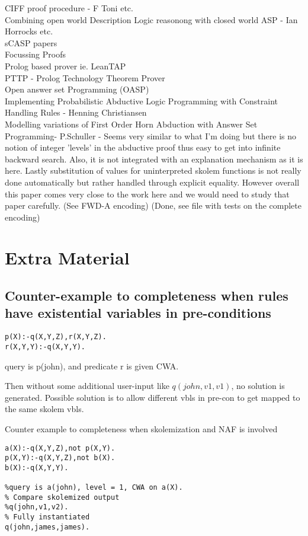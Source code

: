 \documentclass[sigconf]{acmart}
\begin{document}
CIFF proof procedure - F Toni etc.\\
Combining open world Description Logic reasonong with closed world ASP - Ian Horrocks etc.\\
sCASP papers\\
Focussing Proofs\\
Prolog based prover ie. LeanTAP\\
PTTP - Prolog Technology Theorem Prover\\
Open answer set Programming (OASP)\\
Implementing
Probabilistic Abductive Logic Programming
with Constraint Handling Rules - Henning Christiansen\\
Modelling variations of First Order Horn Abduction with Answer Set Programming- P.Schuller - Seems very similar to what I'm doing but there is no notion of integer 'levels' in the abductive proof thus easy to get into infinite backward search. Also, it is not integrated with an explanation mechanism as it is here. Lastly substitution of values for uninterpreted skolem functions is not really done automatically but rather handled through explicit equality. However overall this paper comes very close to the work here and we would need to study that paper carefully. (See FWD-A encoding) (Done, see file with tests on the complete encoding)

\section{Extra Material}
\subsection{Counter-example to completeness when rules have existential variables in pre-conditions}
\begin{verbatim}
p(X):-q(X,Y,Z),r(X,Y,Z).
r(X,Y,Y):-q(X,Y,Y).
\end{verbatim}
query is p(john), and predicate r is given CWA. 

Then without some additional user-input like $q(john, v1,v1)$, no solution is generated. Possible solution is to allow different vbls in pre-con to get mapped to the same skolem vbls.

Counter example to completeness when skolemization and NAF is involved
\begin{verbatim}
a(X):-q(X,Y,Z),not p(X,Y).
p(X,Y):-q(X,Y,Z),not b(X).
b(X):-q(X,Y,Y).

%query is a(john), level = 1, CWA on a(X).
% Compare skolemized output
%q(john,v1,v2).
% Fully instantiated
q(john,james,james).    
\end{verbatim}
\end{document}
